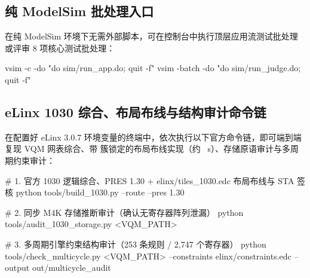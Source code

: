 \subsection{纯 ModelSim 批处理入口}
在纯 ModelSim 环境下无需外部脚本，可在控制台中执行顶层应用流测试批处理或评审 8 项核心测试批处理：
\begin{runcommand}
vsim -c -do "do sim/run_app.do; quit -f"
vsim -batch -do "do sim/run_judge.do; quit -f"
\end{runcommand}

\subsection{eLinx 1030 综合、布局布线与结构审计命令链}
在配置好 eLinx 3.0.7 环境变量的终端中，依次执行以下官方命令链，即可端到端复现 VQM 网表综合、带 \countsep{\LockedClusters} 簇锁定的布局布线实现（约 \ParElapsedSec~s）、存储原语审计与多周期约束审计：
\begin{runcommand}
# 1. 官方 1030 逻辑综合、PRES 1.30 + elinx/tiles_1030.edc 布局布线与 STA 签核
python tools/build_1030.py --route --pres 1.30

# 2. 同步 M4K 存储推断审计（确认无寄存器阵列泄漏）
python tools/audit_1030_storage.py <VQM_PATH>

# 3. 多周期引擎约束结构审计（253 条规则 / 2,747 个寄存器）
python tools/check_multicycle.py <VQM_PATH> --constraints elinx/constraints.edc --output out/multicycle_audit
\end{runcommand}
